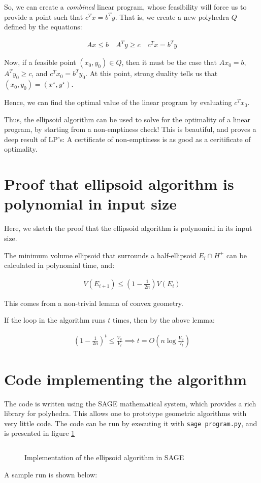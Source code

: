 \documentclass[conference]{IEEEtran}
\begin{document}
So, we can create a \textit{combined} linear program, whose feasibility will
force us to provide a point such that $c^Tx = b^T y$. That is, we create
a new polyhedra $Q$ defined by the equations:

\begin{align*}
        A x \leq b \quad
        A^T y \geq c \quad
        c^Tx = b^T y
\end{align*}

Now, if a feasible point $(x_0, y_0) \in Q$, then it must be the case that $Ax_0 = b$,
$A^Ty_0 \geq c$, and $c^Tx_0 = b^Ty_0$. At this point, strong duality tells us that
$(x_0, y_0) = (x^\star, y^\star)$. 

Hence, we can find the optimal value of the linear program by evaluating $c^T x_0$.


Thus, the ellipsoid algorithm can be used to solve for the optimality of a linear
program, by starting from a non-emptiness check! This is beautiful, and proves
a deep result of LP's: A certificate of non-emptiness is as good as a ceritificate
of optimality.

\section{Proof that ellipsoid algorithm is polynomial in input size}
Here, we sketch the proof that the ellipsoid algorithm is polynomial
in its input size.

The minimum volume ellipsoid that surrounds a half-ellipsoid $E_i \cap H^+$ can
be calculated in polynomial time, and:

\begin{align*}
V(E_{i+1}) \leq (1 - \frac{1}{2n}) V(E_i)
\end{align*}

This comes from a non-trivial lemma of convex geometry.

If the loop in the algorithm runs $t$ times, then by the above lemma:

\begin{align*}
    \left( 1 - \frac{1}{2n} \right)^t \leq \frac{V_u}{V_l} \implies t = O(n \log \frac{V_u}{V_l})
\end{align*}

\section{Code implementing the algorithm}
The code is written using the SAGE mathematical system, which provides a rich
library for polyhedra. This allows one to prototype geometric algorithms
with very little code. The code can be run by executing it with \texttt{sage program.py},
and is presented in figure \ref{fig:code}

\begin{figure}[!htb]
\inputminted{py}{ellipsoid.sage}
\caption{Implementation of the ellipsoid algorithm in SAGE}
\label{fig:code}
\end{figure}

A sample run is shown below:
\inputminted[fontsize=\footnotesize]{text}{ellipsoid-output}




\end{document}
